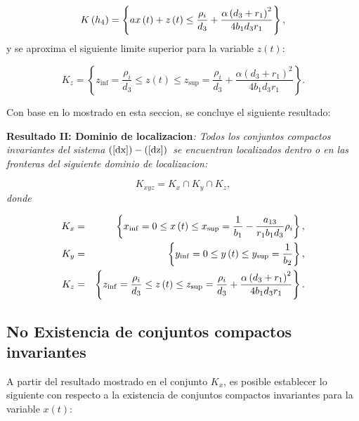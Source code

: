 \documentclass[letterpaper,11pt]{article}
\begin{document}
\begin{equation*}
K\left( h_{4}\right) =\left\{ ax\left( t\right) +z\left( t\right) \leq \frac{%
\rho _{i}}{d_{3}}+\frac{\alpha \left( d_{3}+r_{1}\right) ^{2}}{%
4b_{1}d_{3}r_{1}}\right\} ,
\end{equation*}%
y se aproxima el siguiente limite superior para la variable $z\left(
t\right) $:

\begin{equation*}
K_{z}=\left\{ z_{\inf }=\frac{\rho _{i}}{d_{3}}\leq z\left( t\right) \leq
z_{\sup }=\frac{\rho _{i}}{d_{3}}+\frac{\alpha \left( d_{3}+r_{1}\right) ^{2}%
}{4b_{1}d_{3}r_{1}}\right\} .
\end{equation*}

Con base en lo mostrado en esta seccion, se concluye el siguiente resultado:

\bigskip

\textbf{Resultado II: Dominio de localizacion}\textit{: Todos los conjuntos
compactos invariantes del sistema }$\left( \ref{dx}\right) -\left( \ref{dz}%
\right) $\textit{\ se encuentran localizados dentro o en las fronteras del
siguiente dominio de localizacion:}

\bigskip 
\begin{equation*}
K_{xyz}=K_{x}\cap K_{y}\cap K_{z},
\end{equation*}%
\textit{donde}

\bigskip 
\begin{eqnarray*}
K_{x} &=&\left\{ x_{\inf }=0\leq x\left( t\right) \leq x_{\sup }=\frac{1}{%
b_{1}}-\frac{a_{13}}{r_{1}b_{1}d_{3}}\rho _{i}\right\} , \\
K_{y} &=&\left\{ y_{\inf }=0\leq y\left( t\right) \leq y_{\sup }=\frac{1}{%
b_{2}}\right\} , \\
K_{z} &=&\left\{ z_{\inf }=\frac{\rho _{i}}{d_{3}}\leq z\left( t\right) \leq
z_{\sup }=\frac{\rho _{i}}{d_{3}}+\frac{\alpha \left( d_{3}+r_{1}\right) ^{2}%
}{4b_{1}d_{3}r_{1}}\right\} .
\end{eqnarray*}

\subsection{\protect\bigskip No Existencia de conjuntos compactos invariantes%
}

A partir del resultado mostrado en el conjunto $K_{x}$, es posible
establecer lo siguiente con respecto a la existencia de conjuntos compactos
invariantes para la variable $x\left( t\right) $:
\end{document}
